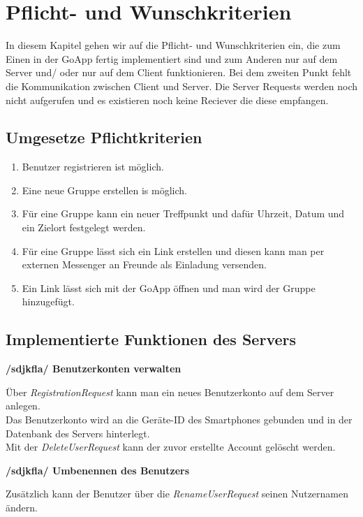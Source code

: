 \section{Pflicht- und Wunschkriterien}

In diesem Kapitel gehen wir auf die Pflicht- und Wunschkriterien ein, die zum Einen in der GoApp fertig implementiert sind und zum Anderen nur auf dem Server und/ oder nur auf dem Client funktionieren. Bei dem zweiten Punkt fehlt die Kommunikation zwischen Client und Server. Die Server Requests werden noch nicht aufgerufen und es existieren noch keine Reciever die diese empfangen.

\subsection{Umgesetze Pflichtkriterien}

\begin{enumerate}
	\item Benutzer registrieren ist möglich.
	\item Eine neue Gruppe erstellen is möglich. 
	\item Für eine Gruppe kann ein neuer Treffpunkt und dafür Uhrzeit, Datum und ein Zielort festgelegt werden. 
	\item Für eine Gruppe lässt sich ein Link erstellen und diesen kann man per externen Messenger an Freunde als Einladung versenden.
	\item Ein Link lässt sich mit der GoApp öffnen und man wird der Gruppe hinzugefügt. 
\end{enumerate}

\subsection{Implementierte Funktionen des Servers}

\textbf{/sdjkfla/ Benutzerkonten verwalten}

Über \textit{RegistrationRequest} kann man ein neues Benutzerkonto auf dem Server anlegen.\\
Das Benutzerkonto wird an die Geräte-ID des Smartphones gebunden und in der\\
Datenbank des Servers hinterlegt.\\
Mit der \textit{DeleteUserRequest} kann der zuvor erstellte Account gelöscht werden.

\textbf{/sdjkfla/ Umbenennen des Benutzers}

Zusätzlich kann der Benutzer über die \textit{RenameUserRequest} seinen Nutzernamen ändern.

